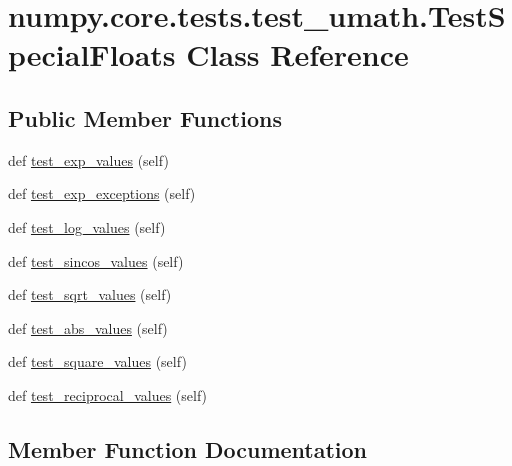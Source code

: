 \hypertarget{classnumpy_1_1core_1_1tests_1_1test__umath_1_1TestSpecialFloats}{}\section{numpy.\+core.\+tests.\+test\+\_\+umath.\+Test\+Special\+Floats Class Reference}
\label{classnumpy_1_1core_1_1tests_1_1test__umath_1_1TestSpecialFloats}
\subsection*{Public Member Functions}
\begin{DoxyCompactItemize}
\item 
def \hyperlink{classnumpy_1_1core_1_1tests_1_1test__umath_1_1TestSpecialFloats_accc33985c47b69ebb976f1d85d751da1}{test\+\_\+exp\+\_\+values} (self)
\item 
def \hyperlink{classnumpy_1_1core_1_1tests_1_1test__umath_1_1TestSpecialFloats_ab04f59879723ec71f58f463fdc0b3f5b}{test\+\_\+exp\+\_\+exceptions} (self)
\item 
def \hyperlink{classnumpy_1_1core_1_1tests_1_1test__umath_1_1TestSpecialFloats_a9a297db3c44a4defd09f561f355f1468}{test\+\_\+log\+\_\+values} (self)
\item 
def \hyperlink{classnumpy_1_1core_1_1tests_1_1test__umath_1_1TestSpecialFloats_afe213f65c06dc7770b4770294e820ba6}{test\+\_\+sincos\+\_\+values} (self)
\item 
def \hyperlink{classnumpy_1_1core_1_1tests_1_1test__umath_1_1TestSpecialFloats_a8bb2670af763bcf0d787cf205b276cc3}{test\+\_\+sqrt\+\_\+values} (self)
\item 
def \hyperlink{classnumpy_1_1core_1_1tests_1_1test__umath_1_1TestSpecialFloats_af53a6e69939859c776557c5a8867b69d}{test\+\_\+abs\+\_\+values} (self)
\item 
def \hyperlink{classnumpy_1_1core_1_1tests_1_1test__umath_1_1TestSpecialFloats_aba58fc2d78ae323d846e5b82ea00c925}{test\+\_\+square\+\_\+values} (self)
\item 
def \hyperlink{classnumpy_1_1core_1_1tests_1_1test__umath_1_1TestSpecialFloats_ad37de9ac768011d23daa58e535bafb36}{test\+\_\+reciprocal\+\_\+values} (self)
\end{DoxyCompactItemize}


\subsection{Member Function Documentation}
\mbox{\label{classnumpy_1_1core_1_1tests_1_1test__umath_1_1TestSpecialFloats_af53a6e69939859c776557c5a8867b69d}} 
